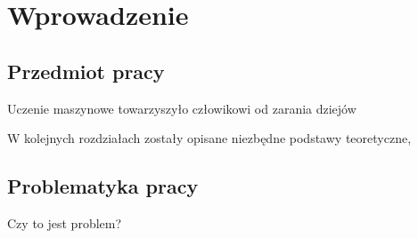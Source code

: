 \section{Wprowadzenie}
\subsection{Przedmiot pracy}
Uczenie maszynowe towarzyszyło człowikowi od zarania dziejów\cite{audacity}

W kolejnych rozdziałach zostały opisane niezbędne podstawy teoretyczne, 
\subsection{Problematyka pracy}
Czy to jest problem?